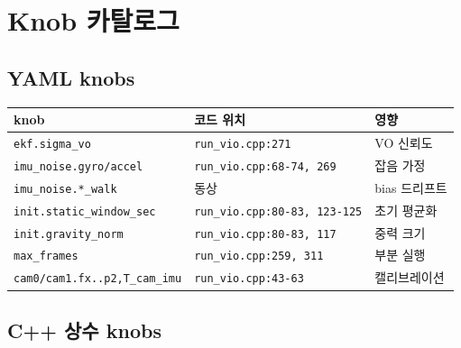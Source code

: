 \documentclass[11pt,a4paper,oneside]{report}
\begin{document}
\chapter{Knob 카탈로그}

\section{YAML knobs}

\begin{center}\small
\begin{tabular}{lll}
\toprule
knob & 코드 위치 & 영향 \\
\midrule
\texttt{ekf.sigma\_vo} & \texttt{run\_vio.cpp:271} & VO 신뢰도 \\
\texttt{imu\_noise.gyro/accel} & \texttt{run\_vio.cpp:68-74, 269} & 잡음 가정 \\
\texttt{imu\_noise.*\_walk} & 동상 & bias 드리프트 \\
\texttt{init.static\_window\_sec} & \texttt{run\_vio.cpp:80-83, 123-125} & 초기 평균화 \\
\texttt{init.gravity\_norm} & \texttt{run\_vio.cpp:80-83, 117} & 중력 크기 \\
\texttt{max\_frames} & \texttt{run\_vio.cpp:259, 311} & 부분 실행 \\
\texttt{cam0/cam1.fx..p2,T\_cam\_imu} & \texttt{run\_vio.cpp:43-63} & 캘리브레이션 \\
\bottomrule
\end{tabular}
\end{center}

\section{C++ 상수 knobs}
\end{document}
